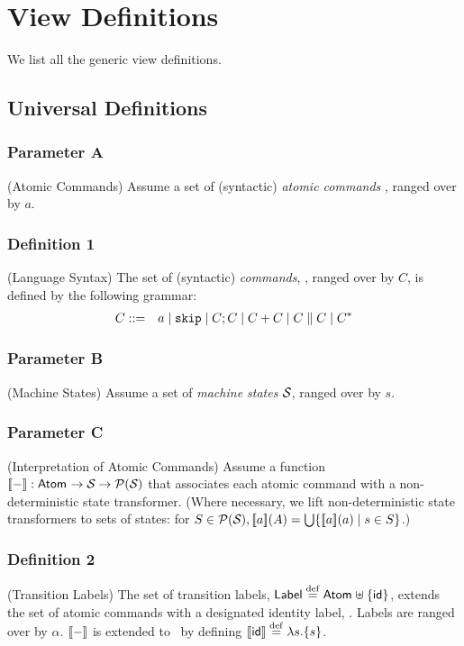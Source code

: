 \section{View Definitions}\label{sec:viewdefs}

We list all the generic view definitions\cite{conf/popl/Dinsdale-YoungBGPY13}.


\subsection{Universal Definitions}

\setcounter{secnumdepth}{0}

\subsubsection{Parameter A}(Atomic Commands)
Assume a set of (syntactic)
\emph{atomic commands} \Atom{}, ranged over by $a$.

\subsubsection{Definition 1} (Language Syntax)
The set of (syntactic) \emph{commands},
\Comm, ranged over by $C$, is defined by the following grammar:
\begin{eqnarray*}
   C &::=& a \mid \mathtt{skip} \mid C ; C \mid C+C \mid C \parallel C \mid C^*
\end{eqnarray*}

\subsubsection{Parameter B}(Machine States)
Assume a set of \emph{machine states} $\mathcal{S}_{\mathsf{}}$,
ranged over by $s$.

\subsubsection{Parameter C}(Interpretation of Atomic Commands)
Assume a function $[\![{-}]\!] : \mathsf{Atom_{}} \rightarrow \mathcal{S}_{\mathsf{}} \rightarrow \mathcal{P}(\mathcal{S}_{\mathsf{}})$
that associates each atomic
command with a non-deterministic state transformer. (Where necessary,
we lift non-deterministic state transformers to sets of states:
for $S \in \mathcal{P}(\mathcal{S}_{\mathsf{}}), [\![{a}]\!](A) = \bigcup\{[\![{a}]\!](a) \mid s \in S\}$.)


\subsubsection{Definition 2} (Transition Labels)
The set of transition labels, $\mathsf{Label} \stackrel{\mathrm{def}}{=} \mathsf{Atom_{}} \uplus \{\mathsf{id}\}$,
extends the set of atomic commands with a
designated identity label, \vid.
Labels are ranged over by $\alpha$.
$[\![{-}]\!]$ is extended to \Label\ by defining $[\![{\mathsf{id}}]\!] \stackrel{\mathrm{def}}{=} \lambda s .\{s\}$.

